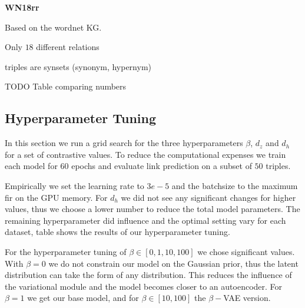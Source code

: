 \textbf{WN18rr}

Based on the wordnet KG.

Only $18$ different relations

triples are synsets (synonym, hypernym)

TODO Table comparing numbers

\subsection{Hyperparameter Tuning}

In this section we run a grid search for the three hyperparameters $\beta$, $d_z$ and $d_h$ for a set of contrastive values. To reduce the computational expenses we train each model for $60$ epochs and  evaluate link prediction on a subset of $50$ triples.

Empirically we set the learning rate to $3e-5$ and the batchsize to the maximum fir on the GPU memory. For $d_h$ we did not see any significant changes for higher values, thus we choose a lower number to reduce the total model parameters. The remaining hyperparameter did influence and the optimal setting vary for each dataset, table \Ref shows the results of our hyperparameter tuning.


For the hyperparameter tuning of $\beta \in [0,1,10,100]$ we chose significant values. With $\beta = 0$ we do not constrain our model on the Gaussian prior, thus the latent distribution can take the form of any distribution. This reduces the influence of the variational module and the model becomes closer to an autoencoder. For $\beta = 1$ we get our base model, and for $\beta \in [10,100]$ the $\beta-$VAE version.


